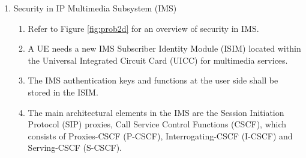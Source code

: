\documentclass[a4paper]{report}
\makeatletter
\DeclareRobustCommand{\textsupsub}[2]{{%
  \m@th\ensuremath{%
    ^{\mbox{\fontsize\sf@size\z@#1}}%
    _{\mbox{\fontsize\sf@size\z@#2}}%
  }%
}}
\makeatother
\begin{document}
\begin{enumerate}
\begin{enumerate}
\begin{enumerate}
\begin{enumerate}
                     from the SGSN.
            \item The UE shall also execute the above same procedure as the MME to derive K\textsupsub{'}{ASME}.
            \item The target MME and the UE shall derive K\textsubscript{eNB} and the corresponding NAS keys according
                     to the key heirarchy of LTE. 
            \end{enumerate}
        \end{enumerate}
    \item Mobility between E-UTRAN and non-3GPP access networks
        \begin{enumerate}
        \item There are several different mobility scenarios between heterogeneous access systems in the LTE networks:
            \begin{enumerate}
            \item Handovers from trusted or untrusted non-3GPP access networks to the E-UTRAN
            \item Handovers from the E-UTRAN to trusted or untrusted non-3GPP access networks
            \end{enumerate}
        \item The UE, the target access network and the EPC will implement a full access authentication procedure before
                 the UE handovers to the new access network.
        \item Different access authentication procedures will be executed in distinct mobility scenarios.
        \end{enumerate}
    \end{enumerate}
\item Security in IP Multimedia Subsystem (IMS)
    \begin{enumerate}
    \item Refer to Figure \ref{fig:prob2d} for an overview of security in IMS.
    \item A UE needs a new IMS Subscriber Identity Module (ISIM) located within the Universal Integrated Circuit Card (UICC)
             for multimedia services.
    \item The IMS authentication keys and functions at the user side shall be stored in the ISIM.
    \item The main architectural elements in the IMS are the Session Initiation Protocol (SIP) proxies, Call Service Control 
             Functions (CSCF), which consists of Proxies-CSCF (P-CSCF), Interrogating-CSCF (I-CSCF) and Serving-CSCF (S-CSCF).

\end{enumerate}
\end{enumerate}
\end{document}
